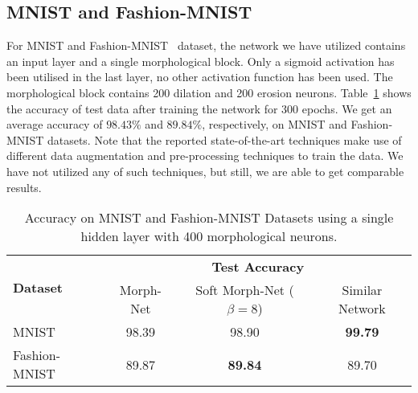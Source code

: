 \documentclass{bmvc2k}
\begin{document}
\subsection{MNIST and Fashion-MNIST} 
For MNIST and Fashion-MNIST~\cite{xiao2017fashion} dataset, the network we have utilized contains an input layer and a single morphological block. Only a sigmoid activation has been utilised in the last layer, no other activation function has been used. The morphological block contains 200 dilation and 200 erosion neurons.
Table~\ref{tab:mnists} shows the accuracy of test data after training the network for 300 epochs. We get an average accuracy of $98.43\%$ and $89.84\%$, respectively, on MNIST and Fashion-MNIST datasets. Note that the reported state-of-the-art techniques make use of different data augmentation and pre-processing techniques to train the data.  We have not utilized any of such techniques, but still, we are able to get comparable results.  


\begin{table}
    \centering
    \label{tab:mnists}
\begin{tabular}[c]{lccc}
        \toprule
        \multirow{2}{*}{\textbf{Dataset}} & \multicolumn{3}{c}{\textbf{Test Accuracy}} \\ \cmidrule{2-4}
        & Morph-Net & Soft Morph-Net ($\beta=8$) & Similar Network \\ 
        \cmidrule(r){1-1}\cmidrule(lr){2-2}\cmidrule(lr){3-3}\cmidrule(l){4-4}
        MNIST & 98.39 & 98.90 & \textbf{99.79} \cite{wan2013regularization} \\ Fashion-MNIST & 89.87 & \textbf{89.84} & 89.70 \cite{xiao2017fashion} \\
        \bottomrule
    \end{tabular}
    \caption{Accuracy on MNIST and Fashion-MNIST Datasets using a single hidden layer with 400 morphological neurons.}
\end{table}
\end{document}
